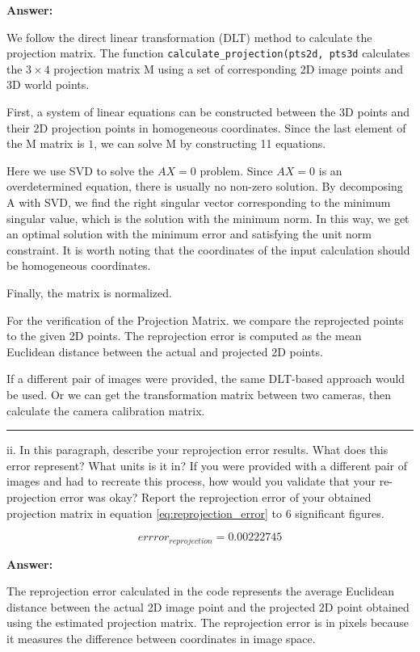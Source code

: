\documentclass[onecolumn,10pt]{article}
\begin{document}
\textbf{Answer:}  

We follow the direct linear transformation (DLT) method to calculate the projection matrix.
The function {\tt  calculate\_projection(pts2d, pts3d} calculates the $3×4$ projection matrix M using a set of corresponding 2D image points and 3D world points.

First, a system of linear equations can be constructed between the 3D points and their 2D projection points in homogeneous coordinates. Since the last element of the M matrix is $1$, we can solve M by constructing 11 equations.

Here we use SVD to solve the $AX = 0$ problem. Since $AX=0$ is an overdetermined equation, there is usually no non-zero solution. By decomposing A with SVD, we find the right singular vector corresponding to the minimum singular value, which is the solution with the minimum norm. In this way, we get an optimal solution with the minimum error and satisfying the unit norm constraint. It is worth noting that the coordinates of the input calculation should be homogeneous coordinates.

Finally, the matrix is normalized.

For the verification of the Projection Matrix. we compare the reprojected points to the given 2D points. The reprojection error is computed as the mean Euclidean distance between the actual and projected 2D points.

If a different pair of images were provided, the same DLT-based approach would be used. Or we can get the transformation matrix between two cameras, then calculate the camera calibration matrix.

\hrule

ii. In this paragraph, describe your reprojection error results. What does this error represent? What units is it in? If you were provided with a different pair of images and had to recreate this process, how would you validate that your re-projection error was okay? Report the reprojection error of your obtained projection matrix in equation \eqref{eq:reprojection_error} to 6 significant figures.


\begin{equation}
errror_{reprojection}=0.00222745 \label{eq:reprojection_error}
\end{equation}

\textbf{Answer:}  

The reprojection error calculated in the code represents the average Euclidean distance between the actual 2D image point and the projected 2D point obtained using the estimated projection matrix. The reprojection error is in pixels because it measures the difference between coordinates in image space.
\end{document}
